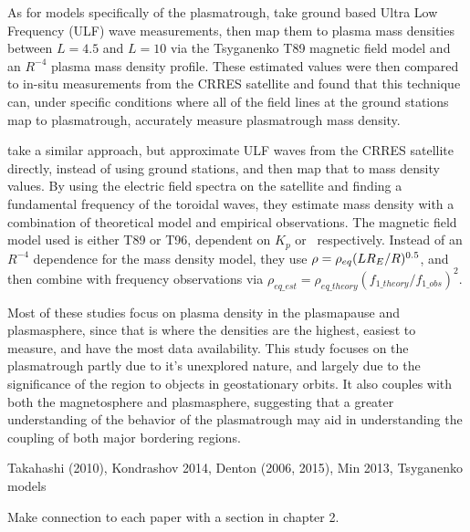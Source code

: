 As for models specifically of the plasmatrough, \cite{Lotoaniu1999PlasmaMassDensity} take ground based Ultra Low Frequency (ULF) wave measurements, then map them to plasma mass densities between $L=4.5$ and $L=10$ via the Tsyganenko T89 magnetic field model and an $R^{-4}$ plasma mass density profile. These estimated values were then compared to in-situ measurements from the CRRES satellite and found that this technique can, under specific conditions where all of the field lines at the ground stations map to plasmatrough, accurately measure plasmatrough mass density. 

\cite{Takahashi2006MassDensityInferred} take a similar approach, but approximate ULF waves from the CRRES satellite directly, instead of using ground stations, and then map that to mass density values. By using the electric field spectra on the satellite and finding a fundamental frequency of the toroidal waves, they estimate mass density with a combination of theoretical model and empirical observations. The magnetic field model used is either T89 or T96, dependent on $K_p$ or \dst\  respectively. Instead of an $R^{-4}$ dependence for the mass density model, they use $\rho=\rho_{eq}(LR_E/R)^{0.5}$, and then combine with frequency observations via $\rho_{eq\_est}=\rho_{eq\_theory}(f_{1\_theory}/f_{1\_obs})^2$.

Most of these studies focus on plasma density in the plasmapause and plasmasphere, since that is where the densities are the highest, easiest to measure, and have the most data availability. This study focuses on the plasmatrough partly due to it's unexplored nature, and largely due to the significance of the region to objects in geostationary orbits. It also couples with both the magnetosphere and plasmasphere, suggesting that a greater understanding of the behavior of the plasmatrough may aid in understanding the coupling of both major bordering regions.


\vnote Takahashi (2010), Kondrashov 2014, Denton (2006, 2015), Min 2013, Tsyganenko models

\note Make connection to each paper with a section in chapter 2.

